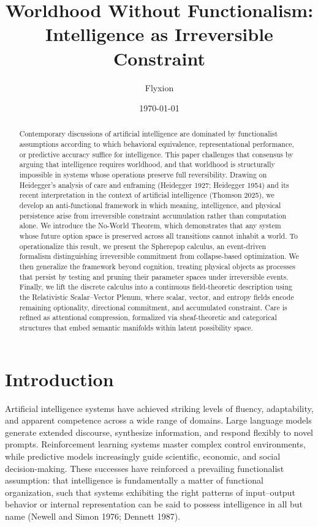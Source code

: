 \documentclass[11pt]{article}
\title{Worldhood Without Functionalism:\\
Intelligence as Irreversible Constraint}
\author{Flyxion}
\date{\today}
\theoremstyle{remark}
\begin{document}
\maketitle

\begin{abstract}
Contemporary discussions of artificial intelligence are dominated by functionalist assumptions according to which behavioral equivalence, representational performance, or predictive accuracy suffice for intelligence. This paper challenges that consensus by arguing that intelligence requires worldhood, and that worldhood is structurally impossible in systems whose operations preserve full reversibility. Drawing on Heidegger’s analysis of care and enframing (Heidegger 1927; Heidegger 1954) and its recent interpretation in the context of artificial intelligence (Thomson 2025), we develop an anti-functional framework in which meaning, intelligence, and physical persistence arise from irreversible constraint accumulation rather than computation alone. We introduce the No-World Theorem, which demonstrates that any system whose future option space is preserved across all transitions cannot inhabit a world. To operationalize this result, we present the Spherepop calculus, an event-driven formalism distinguishing irreversible commitment from collapse-based optimization. We then generalize the framework beyond cognition, treating physical objects as processes that persist by testing and pruning their parameter spaces under irreversible events. Finally, we lift the discrete calculus into a continuous field-theoretic description using the Relativistic Scalar–Vector Plenum, where scalar, vector, and entropy fields encode remaining optionality, directional commitment, and accumulated constraint. Care is refined as attentional compression, formalized via sheaf-theoretic and categorical structures that embed semantic manifolds within latent possibility space.
\end{abstract}

\section{Introduction}

Artificial intelligence systems have achieved striking levels of fluency, adaptability, and apparent competence across a wide range of domains. Large language models generate extended discourse, synthesize information, and respond flexibly to novel prompts. Reinforcement learning systems master complex control environments, while predictive models increasingly guide scientific, economic, and social decision-making. These successes have reinforced a prevailing functionalist assumption: that intelligence is fundamentally a matter of functional organization, such that systems exhibiting the right patterns of input–output behavior or internal representation can be said to possess intelligence in all but name (Newell and Simon 1976; Dennett 1987).
\end{document}
